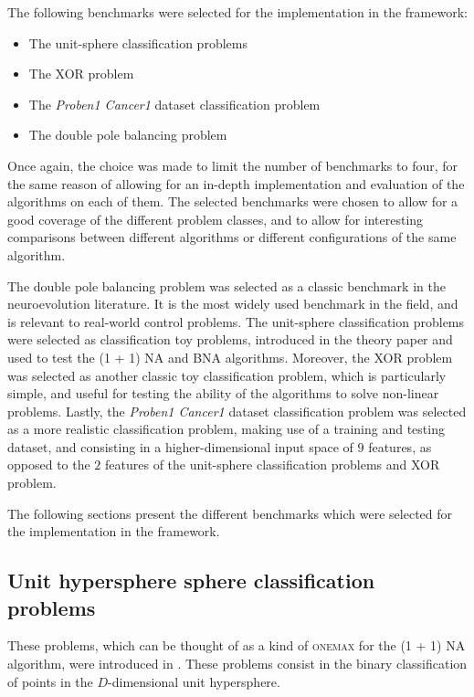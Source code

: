 The following benchmarks were selected for the implementation in the framework:

\begin{itemize}
    \item The unit-sphere classification problems
    \item The XOR problem
    \item The \textit{Proben1 Cancer1} dataset classification problem
    \item The double pole balancing problem
\end{itemize}

Once again, the choice was made to limit the number of benchmarks to four, for the same reason of allowing for an in-depth implementation and evaluation of the algorithms on each of them.
The selected benchmarks were chosen to allow for a good coverage of the different problem classes, and to allow for interesting comparisons between different algorithms or different
configurations of the same algorithm.

The double pole balancing problem was selected as a classic benchmark in the neuroevolution literature. It is the most widely used benchmark in the field, and is relevant to real-world
control problems. The unit-sphere classification problems were selected as classification toy problems, introduced in the theory paper \cite{na} and used to test the (1 + 1) NA and BNA algorithms.
Moreover, the XOR problem was selected as another classic toy classification problem, which is particularly simple, and useful for testing the ability of the algorithms to solve non-linear problems.
Lastly, the \textit{Proben1 Cancer1} dataset classification problem was selected as a more realistic classification problem, making use of a training and testing dataset, and consisting
in a higher-dimensional input space of $9$ features, as opposed to the $2$ features of the unit-sphere classification problems and XOR problem.

The following sections present the different benchmarks which were selected for the implementation in the framework.

\subsection{Unit hypersphere sphere classification problems}
\label{subsection:sphere_classification}

These problems, which can be thought of as a kind of \textsc{onemax} for the (1 + 1) NA algorithm, were introduced in \cite{na}.
These problems consist in the binary classification of points in the $D$-dimensional unit hypersphere.

